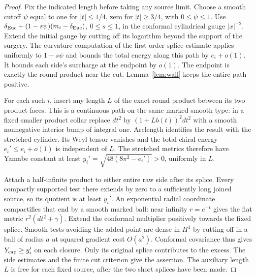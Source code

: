 \begin{proof}
Fix the indicated length before taking any source limit. Choose a
smooth cutoff \(\psi\) equal to one for \(|t|\le 1/4\), zero for
\(|t|\ge3/4\), with \(0\le\psi\le1\). Use
\(\delta_{\rm Euc}+(1-s\psi)(m_i-\delta_{\rm Euc})\),
\(0\le s\le1\), in the conformal cylindrical gauge \(|x|^{-2}\).
Extend the initial gauge by cutting off its logarithm beyond the
support of the surgery. The curvature computation of
the first-order splice estimate \cite[First-order splice]{Baker2026CollarDeformation} applies uniformly to \(1-s\psi\)
and bounds the total energy along this path by \(e_i+o(1)\).
It bounds each side's surcharge at the endpoint by \(o(1)\).
The endpoint is exactly the round product near the cut.
Lemma~\ref{lem:wall} keeps the entire path positive.

For each such \(i\), insert any length \(L\) of the exact round
product between its two product faces. This is a continuous path
on the same marked smooth type: in a fixed smaller product collar
replace \(dt^2\) by \((1+L b(t))^2dt^2\) with a smooth
nonnegative interior bump of integral one. Arclength identifies
the result with the stretched cylinder. Its Weyl tensor vanishes
and the total chiral energy \(e_i'\le e_i+o(1)\) is independent
of \(L\). The stretched metrics therefore have Yamabe constant at
least \(y_i'=\sqrt{48(8\pi^2-e_i')}>0\), uniformly in \(L\).

Attach a half-infinite product to either entire raw side after its
splice. Every compactly supported test there extends by zero to a
sufficiently long joined source, so its quotient is at least \(y_i'\).
An exponential radial coordinate compactifies that end by a smooth
marked ball: near infinity \(r=e^{-t}\) gives the flat metric
\(r^2(dt^2+\gamma)\). Extend the conformal multiplier positively
towards the fixed splice. Smooth tests avoiding the added point
are dense in \(H^1\) by cutting off in a ball of radius \(a\)
at squared gradient cost \(O(a^2)\). Conformal covariance thus gives
\(Y_{\rm cap}\ge y_i'\) on each closure. Only its original splice
contributes to the excess. The side estimates and
the finite cut criterion \cite[Finite cut criterion]{Baker2026ChiralMaster} give the assertion. The auxiliary
length \(L\) is free for each fixed source, after the two short
splices have been made.
\end{proof}

